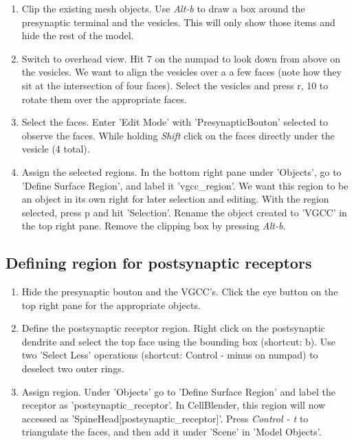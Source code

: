 \documentclass[twoside,a4paper]{refart}
\begin{document}
\begin{enumerate}
\item   Clip the existing mesh objects. Use \textit{Alt-b} to draw a box around the presynaptic terminal and the vesicles. This will only show those items and hide the rest of the model.
    
\item   Switch to overhead view. Hit 7 on the numpad to look down from above on the vesicles. We want to align the vesicles over a a few faces (note how they sit at the intersection of four faces). Select the vesicles and press r, 10 to rotate them over the appropriate faces.

\item   Select the faces. Enter 'Edit Mode' with 'PresynapticBouton' selected to observe the faces. While holding \textit{Shift} click on the faces directly under the vesicle (4 total). 

\item   Assign the selected regions. In the bottom right pane under 'Objects', go to 'Define Surface Region', and label it 'vgcc\_region'. We want this region to be an object in its own right for later selection and editing. With the region selected, press p and hit 'Selection'. Rename the object created to 'VGCC' in the top right pane. Remove the clipping box by pressing \textit{Alt-b}.
\end{enumerate}

\subsection{Defining region for postsynaptic receptors}

\begin{enumerate}
\item   Hide the presynaptic bouton and the VGCC's. Click the eye button on the top right pane for the appropriate objects.

\item   Define the postsynaptic receptor region. Right click on the postsynaptic dendrite and select the top face using the bounding box (shortcut: b). Use two 'Select Less' operations (shortcut: Control - minus on numpad) to deselect two outer rings. 

\item   Assign region. Under 'Objects' go to 'Define Surface Region' and label the receptor as 'postsynaptic\_receptor'. In CellBlender, this region will now accessed as 'SpineHead[postsynaptic\_receptor]'. Press \textit{Control - t} to triangulate the faces, and then add it under 'Scene' in 'Model Objects'.

\end{enumerate}
\end{document}
